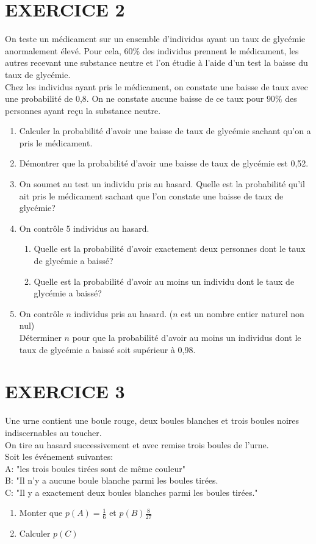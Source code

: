 \documentclass[12pts]{book}
\begin{document}
	\section*{EXERCICE 2}
	On teste un médicament sur un ensemble d'individus ayant un taux de glycémie anormalement élevé. Pour cela, $60 \%$ des individus prennent le médicament, les autres recevant une substance neutre et l'on étudie à l'aide d'un test la baisse du taux de glycémie.\\
	Chez les individus ayant pris le médicament, on constate une baisse de taux avec une probabilité de 0,8. On ne constate aucune baisse de ce taux pour $90\%$  des personnes ayant reçu la substance neutre.
	\begin{enumerate}
		\item Calculer la probabilité d'avoir une baisse de taux de glycémie sachant qu'on a pris le médicament.
		\item Démontrer que la probabilité d'avoir une baisse de taux de glycémie est 0,52.
		\item On soumet au test un individu pris au hasard. Quelle est la probabilité qu'il ait pris le médicament sachant que l'on constate une baisse de taux de glycémie?
		\item On contrôle 5 individus au hasard.
		\begin{enumerate}
			\item Quelle est la probabilité d'avoir exactement deux personnes dont le taux de glycémie a baissé?
			\item Quelle est la probabilité d'avoir au moins un individu dont le taux de glycémie a baissé?
		\end{enumerate}
		\item On contrôle $n$ individus pris au hasard. ($n$ est un nombre entier naturel non nul)\\
		Déterminer $n$ pour que la probabilité d'avoir au moins un individus dont le taux de glycémie a baissé soit supérieur à 0,98.
	\end{enumerate}
	
	\section*{EXERCICE 3}
	Une urne contient une boule rouge, deux boules blanches et trois boules noires indiscernables au toucher.\\
	On tire au hasard successivement et avec remise trois boules de l'urne.\\
	Soit les événement suivantes:\\
	A: "les trois boules tirées sont de même couleur"\\
	B: "Il n'y a aucune boule blanche parmi les boules tirées.\\
	C: "Il y a exactement deux boules blanches parmi les boules tirées."
	\begin{enumerate}
		\item Monter que $p(A)=\frac{1}{6}$ et $p(B)$$\frac{8}{27}$
		\item Calculer $p(C)$
	\end{enumerate}
	
\end{document}
